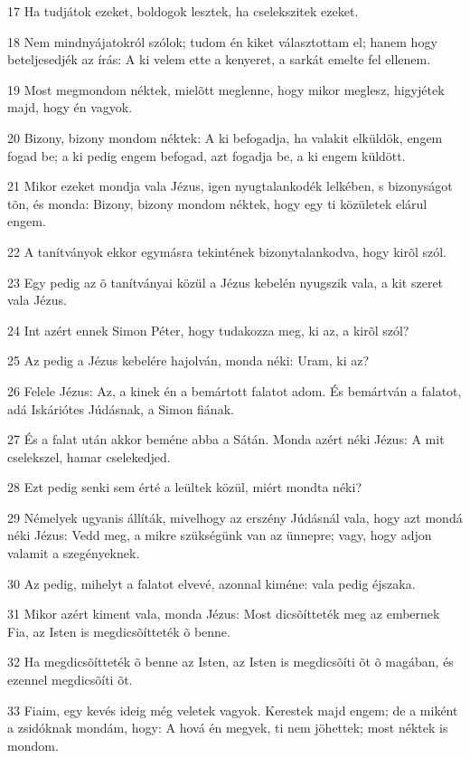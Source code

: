 \par 17 Ha tudjátok ezeket, boldogok lesztek, ha cselekszitek ezeket.
\par 18 Nem mindnyájatokról szólok; tudom én kiket választottam el; hanem hogy beteljesedjék az írás: A ki velem ette a kenyeret, a sarkát emelte fel ellenem.
\par 19 Most megmondom néktek, mielõtt meglenne, hogy mikor meglesz, higyjétek majd, hogy én vagyok.
\par 20 Bizony, bizony mondom néktek: A ki befogadja, ha valakit elküldök, engem fogad be; a ki pedig engem befogad, azt fogadja be, a ki engem küldött.
\par 21 Mikor ezeket mondja vala Jézus, igen nyugtalankodék lelkében, s bizonyságot tõn, és monda: Bizony, bizony mondom néktek, hogy egy ti közületek elárul engem.
\par 22 A tanítványok ekkor egymásra tekintének bizonytalankodva, hogy kirõl szól.
\par 23 Egy pedig az õ tanítványai közül a Jézus kebelén nyugszik vala, a kit szeret vala Jézus.
\par 24 Int azért ennek Simon Péter, hogy tudakozza meg, ki az, a kirõl szól?
\par 25 Az pedig a Jézus kebelére hajolván, monda néki: Uram, ki az?
\par 26 Felele Jézus: Az, a kinek én a bemártott falatot adom. És bemártván a falatot, adá Iskáriótes Júdásnak, a Simon fiának.
\par 27 És a falat után akkor beméne abba a Sátán. Monda azért néki Jézus: A mit cselekszel, hamar cselekedjed.
\par 28 Ezt pedig senki sem érté a leültek közül, miért mondta néki?
\par 29 Némelyek ugyanis állíták, mivelhogy az erszény Júdásnál vala, hogy azt mondá néki Jézus: Vedd meg, a mikre szükségünk van az ünnepre; vagy, hogy adjon valamit a szegényeknek.
\par 30 Az pedig, mihelyt a falatot elvevé, azonnal kiméne: vala pedig éjszaka.
\par 31 Mikor azért kiment vala, monda Jézus: Most dicsõítteték meg az embernek Fia, az Isten is megdicsõítteték õ benne.
\par 32 Ha megdicsõítteték õ benne az Isten, az Isten is megdicsõíti õt õ magában, és ezennel megdicsõíti õt.
\par 33 Fiaim, egy kevés ideig még veletek vagyok. Kerestek  majd engem; de a miként a zsidóknak mondám, hogy: A hová én megyek, ti nem jöhettek; most néktek is mondom.
